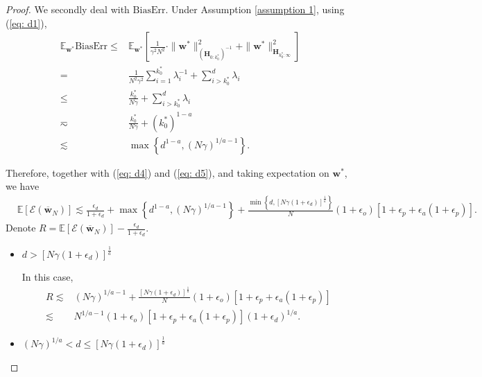 \documentclass[11pt, letterpaper]{article}
\begin{document}
\begin{proof}
    We secondly deal with $\mathrm{BiasErr}$. Under Assumption \ref{assumption 1}, using (\ref{eq: d1}),
    \begin{equation}
        \label{eq: d5}
        \begin{aligned}
            \mathbb{E}_{\mathbf{w}^*}\mathrm{BiasErr}\leq&
            \mathbb{E}_{\mathbf{w}^*}\left[\frac{1}{\gamma^2N^2}\cdot\|{\mathbf{w}}^*\|_{(\mathbf{H}_{0:k_0^*})^{-1}}^2+\|{\mathbf{w}}^*\|_{\mathbf{H}_{k_0^*:\infty}}^2\right]\\
            =&\frac{1}{N^2\gamma^2}\sum_{i=1}^{k_0^*}\lambda_i^{-1}+\sum_{i>k_0^*}^{d}\lambda_i\\
            \leq& \frac{k_0^*}{N\gamma}+\sum_{i>k_0^*}^{d}\lambda_i\\
            \eqsim&\frac{k_0^*}{N\gamma}+(k_0^*)^{1-a}\\
            \lesssim&\max\left\{d^{1-a},(N\gamma)^{1/a-1}\right\}.
        \end{aligned}
    \end{equation}
    
    Therefore, together with (\ref{eq: d4}) and (\ref{eq: d5}), and taking expectation on $\mathbf{w}^*$, we have
    \begin{equation*}
        \begin{aligned}
            &\mathbb{E}[\mathcal{E}(\overline{\mathbf{w}}_N)]\lesssim  \frac{\epsilon_d}{1+\epsilon_d}+\max\left\{d^{1-a},(N\gamma)^{1/a-1}\right\}+\frac{\min \left\{d,\left[N\gamma (1+\epsilon_d)\right]^{\frac{1}{a}}\right\}}{N}(1+\epsilon_o) [1+\epsilon_p+\epsilon_a(1+\epsilon_p)].
        \end{aligned}
    \end{equation*}
    Denote $R=\mathbb{E}[\mathcal{E}(\overline{\mathbf{w}}_N)]-\frac{\epsilon_d}{1+\epsilon_d}$.
    \begin{itemize}[leftmargin=*,nosep]
        \item $d>\left[N\gamma (1+\epsilon_d)\right]^{\frac{1}{a}}$

        In this case,
        \begin{equation*}
            \begin{aligned}
                R\lesssim& (N\gamma)^{1/a-1}+\frac{\left[N\gamma (1+\epsilon_d)\right]^{\frac{1}{a}}}{N}(1+\epsilon_o) [1+\epsilon_p+\epsilon_a(1+\epsilon_p)]\\
                \lesssim& N^{1/a-1}(1+\epsilon_o) [1+\epsilon_p+\epsilon_a(1+\epsilon_p)](1+\epsilon_d)^{1/a}.
            \end{aligned}
        \end{equation*}
        \item $(N\gamma)^{1/a}<d\leq \left[N\gamma (1+\epsilon_d)\right]^{\frac{1}{a}}$


\end{itemize}
\end{proof}
\end{document}
